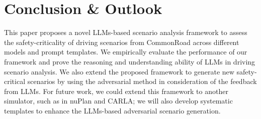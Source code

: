\section{Conclusion \& Outlook}
\label{sec:conclusion}
This paper proposes a novel LLMs-based scenario analysis framework to assess the safety-criticality of driving scenarios from CommonRoad across different models and prompt templates. We empirically evaluate the performance of our framework and prove the reasoning and understanding ability of LLMs in driving scenario analysis. We also extend the proposed framework to generate new safety-critical scenarios by using the adversarial method in consideration of the feedback from LLMs. For future work, we could extend this framework to another simulator, such as in nuPlan and CARLA; we will also develop systematic templates to enhance the LLMs-based adversarial scenario generation.
